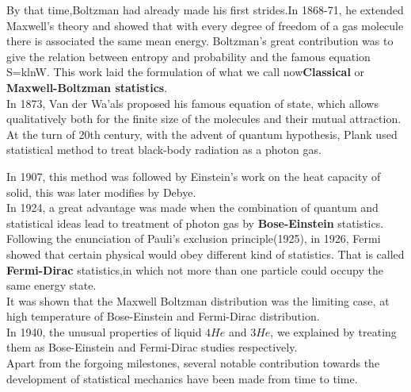 \documentclass{article}
\newcommand*{\1}{\hspace{1pt}}
\begin{document}
By that time,Boltzman had already made his first strides.In 1868-71, he extended Maxwell's theory and showed that with every degree of freedom of a gas molecule there is associated the same mean energy. Boltzman's great contribution was to give the relation between entropy and probability and the famous equation S=klnW. This work laid the formulation of what we call now\textbf{Classical} or \textbf{Maxwell-Boltzman statistics}\cite{l3}.\\



In 1873, Van der Wa'als proposed his famous equation of state, which allows qualitatively both for the finite size of the molecules and their mutual attraction.\\




At the turn of 20th century, with the advent of quantum hypothesis, Plank used statistical method to treat black-body radiation as a photon gas.

In 1907, this method was followed by Einstein's work on the heat capacity of solid\cite{l1}, this was later modifies by Debye.\\


In 1924, a great advantage was made when the combination of quantum and statistical ideas lead to treatment of photon gas by \textbf{Bose-Einstein}\cite{l2} statistics.\\




Following the enunciation of Pauli's exclusion principle(1925), in 1926, Fermi showed that certain physical would obey different kind of statistics. That is called \textbf{Fermi-Dirac}\cite{l4} statistics,in which not more than one particle could occupy the same energy state.\\


It was shown that the Maxwell Boltzman distribution was the limiting case, at high temperature of Bose-Einstein and Fermi-Dirac distribution.\cite{l4}\\



In 1940, the unusual properties of liquid $4He$ and $3He$, we explained by treating them as Bose-Einstein and Fermi-Dirac studies respectively.\\


Apart from the forgoing milestones, several notable contribution towards the development of statistical mechanics have been made from time to time.\\
\end{document}
